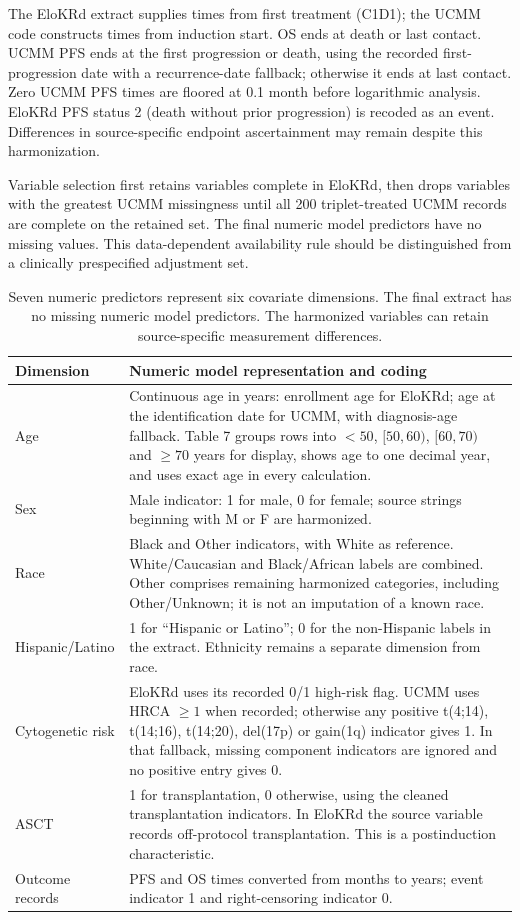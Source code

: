 The EloKRd extract supplies times from first treatment (C1D1); the UCMM code constructs times from induction start. OS ends at death or last contact. UCMM PFS ends at the first progression or death, using the recorded first-progression date with a recurrence-date fallback; otherwise it ends at last contact. Zero UCMM PFS times are floored at 0.1 month before logarithmic analysis. EloKRd PFS status 2 (death without prior progression) is recoded as an event. Differences in source-specific endpoint ascertainment may remain despite this harmonization.

Variable selection first retains variables complete in EloKRd, then drops variables with the greatest UCMM missingness until all 200 triplet-treated UCMM records are complete on the retained set. The final numeric model predictors have no missing values. This data-dependent availability rule should be distinguished from a clinically prespecified adjustment set.

\begin{table}[htbp]
\centering\small
\caption{Harmonized model variables in the myeloma application.}\label{tab:S9}
\begin{tabular}{p{1.3in}p{4.6in}}
\toprule
Dimension & Numeric model representation and coding\\\midrule
Age & Continuous age in years: enrollment age for EloKRd; age at the identification date for UCMM, with diagnosis-age fallback. Table 7 groups rows into $<50$, $[50,60)$, $[60,70)$ and $\geq70$ years for display, shows age to one decimal year, and uses exact age in every calculation.\\
Sex & Male indicator: 1 for male, 0 for female; source strings beginning with M or F are harmonized.\\
Race & Black and Other indicators, with White as reference. White/Caucasian and Black/African labels are combined. Other comprises remaining harmonized categories, including Other/Unknown; it is not an imputation of a known race.\\
Hispanic/Latino & 1 for ``Hispanic or Latino''; 0 for the non-Hispanic labels in the extract. Ethnicity remains a separate dimension from race.\\
Cytogenetic risk & EloKRd uses its recorded 0/1 high-risk flag. UCMM uses HRCA $\geq1$ when recorded; otherwise any positive t(4;14), t(14;16), t(14;20), del(17p) or gain(1q) indicator gives 1. In that fallback, missing component indicators are ignored and no positive entry gives 0.\\
ASCT & 1 for transplantation, 0 otherwise, using the cleaned transplantation indicators. In EloKRd the source variable records off-protocol transplantation. This is a postinduction characteristic.\\
Outcome records & PFS and OS times converted from months to years; event indicator 1 and right-censoring indicator 0.\\
\bottomrule
\end{tabular}
\caption*{Seven numeric predictors represent six covariate dimensions. The final extract has no missing numeric model predictors. The harmonized variables can retain source-specific measurement differences.}
\end{table}

